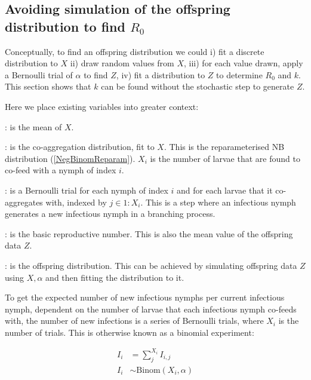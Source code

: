 \documentclass[hidelinks]{article}
\begin{document}
\subsection{Avoiding simulation of the offspring distribution to find \texorpdfstring{$ R_0 $}{R0}}

Conceptually, to find an offspring distribution we could i) fit a discrete distribution to $ X $ ii) draw random values from $ X $, iii) for each value drawn, apply a Bernoulli trial of $ \alpha $ to find $ Z $, iv) fit a distribution to $ Z $ to determine $ R_0 $ and $ k $. This section shows that $ k $ can be found without the stochastic step to generate $ Z $. 

Here we place existing variables into greater context:

\begin{description}[leftmargin=4cm, style=multiline]
	\item[$ m = \frac{1}{n} \sum_i^n L_i $] : is the mean of $ X $.
	\item[$ X \sim \text{NB}(m, k) $] : is the co-aggregation distribution, fit to $ X $. This is the reparameterised NB distribution (\ref{NegBinomReparam}).
	$ X_i $ is the number of larvae that are found to co-feed with a nymph of index $ i $.
	\item[$ I_{i,j} \sim \text{Bern}(p=\alpha) $] : is a Bernoulli trial for each nymph of index $ i $ and for each larvae that it co-aggregates with, indexed by $ j \in 1:X_i $. This is a step where an infectious nymph generates a new infectious nymph in a branching process.
	\item[$ R_0 $] : is the basic reproductive number. This is also the mean value of the offspring data $ Z $.
	\item[$ Z \sim \text{NB}(R_0, k) $] : is the offspring distribution. This can be achieved by  simulating offspring data $ Z $ using $ X, \alpha $ and then fitting the distribution to it.
\end{description}

To get the expected number of new infectious nymphs per current infectious nymph, dependent on the number of larvae that each infectious nymph co-feeds with, the number of new infections is a series of Bernoulli trials, where $ X_i $ is the number of trials. This is otherwise known as a binomial experiment:

\begin{align}
    I_i &= \sum_j^{X_i} I_{i,j} \nonumber \\
    I_i &\sim \text{Binom}(X_i,\alpha)\label{BinomialExperiment}
\end{align}
\end{document}

